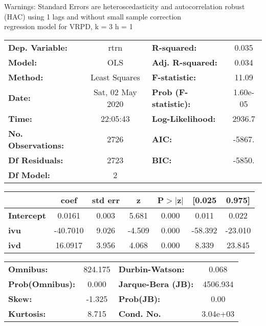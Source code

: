 Warnings: \newline
 [1] Standard Errors are heteroscedasticity and autocorrelation robust (HAC) using 1 lags and without small sample correction\\ 

regression model for VRPD, k = 3 h = 1\begin{center}
\begin{tabular}{lclc}
\toprule
\textbf{Dep. Variable:}    &       rtrn       & \textbf{  R-squared:         } &     0.035   \\
\textbf{Model:}            &       OLS        & \textbf{  Adj. R-squared:    } &     0.034   \\
\textbf{Method:}           &  Least Squares   & \textbf{  F-statistic:       } &     11.09   \\
\textbf{Date:}             & Sat, 02 May 2020 & \textbf{  Prob (F-statistic):} &  1.60e-05   \\
\textbf{Time:}             &     22:05:43     & \textbf{  Log-Likelihood:    } &    2936.7   \\
\textbf{No. Observations:} &        2726      & \textbf{  AIC:               } &    -5867.   \\
\textbf{Df Residuals:}     &        2723      & \textbf{  BIC:               } &    -5850.   \\
\textbf{Df Model:}         &           2      & \textbf{                     } &             \\
\bottomrule
\end{tabular}
\begin{tabular}{lcccccc}
                   & \textbf{coef} & \textbf{std err} & \textbf{z} & \textbf{P$> |$z$|$} & \textbf{[0.025} & \textbf{0.975]}  \\
\midrule
\textbf{Intercept} &       0.0161  &        0.003     &     5.681  &         0.000        &        0.011    &        0.022     \\
\textbf{ivu}       &     -40.7010  &        9.026     &    -4.509  &         0.000        &      -58.392    &      -23.010     \\
\textbf{ivd}       &      16.0917  &        3.956     &     4.068  &         0.000        &        8.339    &       23.845     \\
\bottomrule
\end{tabular}
\begin{tabular}{lclc}
\textbf{Omnibus:}       & 824.175 & \textbf{  Durbin-Watson:     } &    0.068  \\
\textbf{Prob(Omnibus):} &   0.000 & \textbf{  Jarque-Bera (JB):  } & 4506.934  \\
\textbf{Skew:}          &  -1.325 & \textbf{  Prob(JB):          } &     0.00  \\
\textbf{Kurtosis:}      &   8.715 & \textbf{  Cond. No.          } & 3.04e+03  \\
\bottomrule
\end{tabular}
\end{center}

